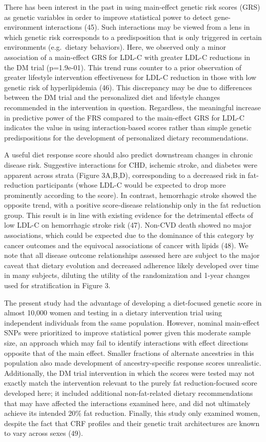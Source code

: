 \documentclass[]{article}
\begin{document}
There has been interest in the past in using main-effect genetic risk
scores (GRS) as genetic variables in order to improve statistical power
to detect gene-environment interactions (45). Such interactions may be
viewed from a lens in which genetic risk corresponds to a predisposition
that is only triggered in certain environments (e.g.~dietary behaviors).
Here, we observed only a minor association of a main-effect GRS for
LDL-C with greater LDL-C reductions in the DM trial (p=1.9e-01). This
trend runs counter to a prior observation of greater lifestyle
intervention effectiveness for LDL-C reduction in those with low genetic
risk of hyperlipidemia (46). This discrepancy may be due to differences
between the DM trial and the personalized diet and lifestyle changes
recommended in the intervention in question. Regardless, the meaningful
increase in predictive power of the FRS compared to the main-effect GRS
for LDL-C indicates the value in using interaction-based scores rather
than simple genetic predispositions for the development of personalized
dietary recommendations.

A useful diet response score should also predict downstream changes in
chronic disease risk. Suggestive interactions for CHD, ischemic stroke,
and diabetes were apparent across strata (Figure 3A,B,D), corresponding
to a decreased risk in fat-reduction participants (whose LDL-C would be
expected to drop more prominently according to the score). In contrast,
hemorrhagic stroke showed the opposite trend, with a positive
score-disease relationship only in the fat reduction group. This result
is in line with existing evidence for the detrimental effects of low
LDL-C on hemorrhagic stroke risk (47). Non-CVD death showed no major
associations, which could be expected due to the dominance of this
category by cancer outcomes and the equivocal associations of cancer
with lipids (48). We note that all disease outcome relationships
assessed here are subject to the major caveat that dietary evolution and
decreased adherence likely developed over time in many subjects,
diluting the utility of the randomization and 1-year changes used for
stratification in Figure 3.

The present study had the advantage of developing a diet-focused genetic
score in almost 10,000 women and testing in a dietary intervention trial
using independent individuals from the same population. However, nominal
main-effect SNPs were prioritized to improve statistical power given
this moderate sample size, an approach which may fail to identify
interactions with effect directions opposite that of the main effect.
Smaller fractions of alternate ancestries in this population also made
development of ancestry-specific response scores unrealistic.
Additionally, the DM trial intervention in which the scores were tested
may not exactly match the intervention relevant to the purely fat
reduction-focused score developed here; it included additional
non-fat-related dietary recommendations that may have affected the
interactions examined here, and did not ultimately achieve its intended
20\% fat reduction. Finally, this study only examined women, despite the
fact that CRF profiles and their genetic trait architectures are known
to vary across sexes (49).
\end{document}
